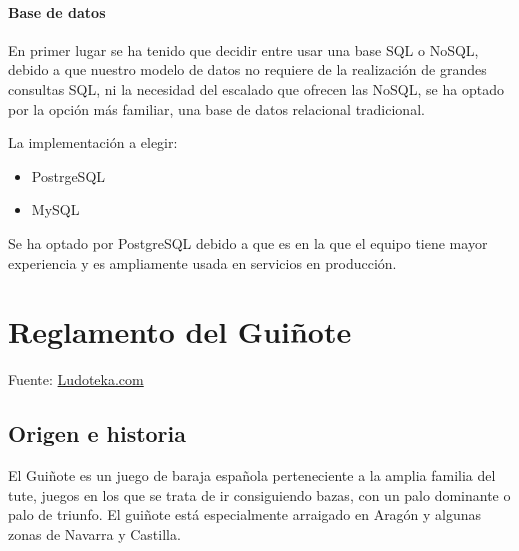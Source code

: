 \documentclass{article}
\begin{document}
\paragraph*{Base de datos}

En primer lugar se ha tenido que decidir entre usar una base SQL o NoSQL, debido a que nuestro modelo de datos no requiere de la realización de grandes consultas 
SQL, ni la necesidad del escalado que ofrecen las NoSQL, se ha optado por la opción más familiar, una base de datos relacional tradicional.

La implementación a elegir:

\begin{itemize}
    \item PostrgeSQL
    \item MySQL
\end{itemize}

Se ha optado por PostgreSQL debido a que es en la que el equipo tiene mayor experiencia y es ampliamente usada en servicios en producción.





\appendix
\section{Reglamento del Guiñote}
Fuente: \href{https://www.ludoteka.com/clasika/guinote.html}{Ludoteka.com}

\subsection*{Origen e historia}
El Guiñote es un juego de baraja española perteneciente a la amplia familia del tute, juegos en los que se trata de ir consiguiendo bazas, con un palo dominante o palo de triunfo. El guiñote está especialmente arraigado en Aragón y algunas zonas de Navarra y Castilla.
\end{document}
